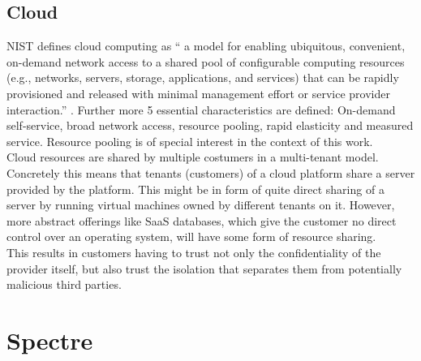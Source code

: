 \documentclass[conference,compsoc,final,a4paper]{IEEEtran}
\begin{document}
\subsection{Cloud}
\ac{NIST} defines cloud computing as \enquote{\textelp{} a model for enabling ubiquitous, convenient, on-demand network access to a shared pool of configurable computing resources (e.g., networks, servers, storage, applications, and services) that can be rapidly provisioned and released with minimal management effort or service provider interaction.} \textcite{mell2011nist}. Further more 5 essential characteristics are defined: On-demand self-service, broad network access, resource pooling, rapid   elasticity and measured service. Resource pooling is of special interest in the context of this work. \\
Cloud resources are shared by multiple costumers in a multi-tenant model. \cite{mell2011nist} Concretely this means that tenants (customers) of a cloud platform share a server provided by the platform. This might be in form of quite direct sharing of a server by running virtual machines owned by different tenants on it. However, more abstract offerings like \ac{SaaS} databases, which give the customer no direct control over an operating system, will have some form of resource sharing. \\
This results in customers having to trust not only the confidentiality of the provider itself, but also trust the isolation that separates them from potentially malicious third parties.
\section{Spectre}
\end{document}
